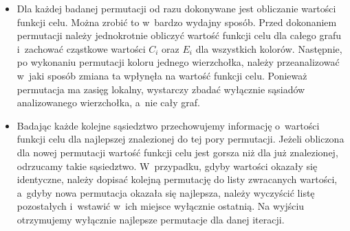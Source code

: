 \documentclass[a4paper,10pt]{article}
\begin{document}
\begin{itemize}
    \item Dla każdej badanej permutacji od razu dokonywane jest obliczanie wartości funkcji celu. Można zrobić to w~bardzo wydajny sposób. Przed dokonaniem permutacji należy jednokrotnie obliczyć wartość funkcji celu dla całego grafu i~zachować cząstkowe wartości $C_{i}$ oraz $E_{i}$ dla wszystkich kolorów. Następnie, po wykonaniu permutacji koloru jednego wierzchołka, należy przeanalizować w~jaki sposób zmiana ta wpłynęła na wartość funkcji celu. Ponieważ permutacja ma zasięg lokalny, wystarczy zbadać wyłącznie sąsiadów analizowanego wierzchołka, a~nie cały graf.
    \item Badając każde kolejne sąsiedztwo przechowujemy informację o~wartości funkcji celu dla najlepszej znalezionej do tej pory permutacji. Jeżeli obliczona dla nowej permutacji wartość funkcji celu jest gorsza niż dla już znalezionej, odrzucamy takie sąsiedztwo. W~przypadku, gdyby wartości okazały się identyczne, należy dopisać kolejną permutację do listy zwracanych wartości, a~gdyby nowa permutacja okazała się najlepsza, należy wyczyścić listę pozostałych i~wstawić w~ich miejsce wyłącznie ostatnią. Na wyjściu otrzymujemy wyłącznie najlepsze permutacje dla danej iteracji.
\end{itemize}
\end{document}
